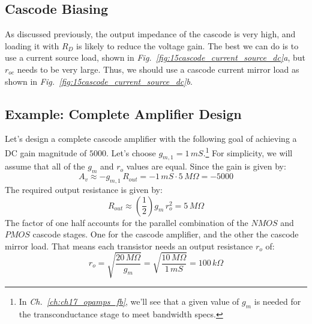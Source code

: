 \subsection{Cascode Biasing}
As discussed previously, the output impedance of the cascode is very high, and loading it with $R_D$ is likely to reduce the voltage gain.  The best we can do is to use a current source load, shown in \emph{Fig.~\ref{fig:15cascode_current_source_dc}a}, but $r_{oc}$ needs to be very large. Thus, we should use a cascode current mirror load as shown in \emph{Fig.~\ref{fig:15cascode_current_source_dc}b}.
\subsection{Example:  Complete Amplifier Design}
Let's design a complete cascode amplifier with the following goal of achieving a DC gain magnitude of $5000$.   Let's choose $g_{m,1} = 1\,mS$.\footnote{In \emph{Ch.~\ref{ch:ch17_opamps_fb}}, we'll see that a given value of $g_m$ is needed for the transconductance stage to meet bandwidth specs.} For simplicity, we will assume that all of the $g_m$ and $r_o$ values are equal.  Since the gain is given by:
    \begin{equation} 
        {A_v} \approx - g_{m,1}\,R_{out} = -1\,mS \cdot 5\,M\Omega = \boxed{-5000}
    \end{equation}
The required output resistance is given by:
    \begin{equation} 
        R_{out} \approx \left(\frac{1}{2}\right)g_m\,r_o^2 = \boxed{5\,M\Omega}
    \end{equation}
The factor of one half accounts for the parallel combination of the $NMOS$ and $PMOS$ cascode stages.  One for the cascode amplifier, and the other the cascode mirror load.  That means each transistor needs an output resistance $r_o$ of:
    \begin{equation} 
        r_o = \sqrt{\frac{20\,M\Omega}{g_m}}
        = \sqrt{\frac{10\,M\Omega}{1\,mS}} = \boxed{100\,k\Omega}
    \end{equation}
\newpage
